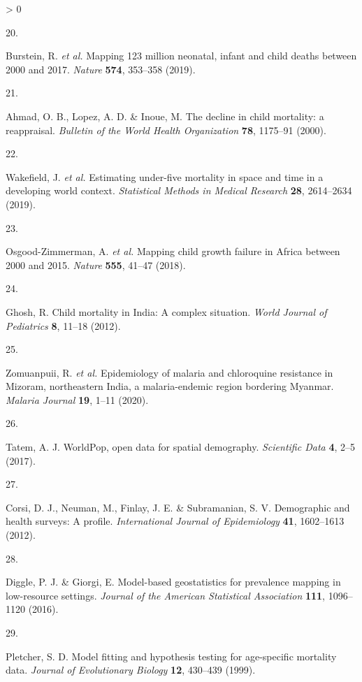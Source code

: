 \documentclass[
]{article}
\newlength{\cslhangindent}
\newlength{\csllabelwidth}
\newenvironment{CSLReferences}[2] %
 {%
  \setlength{\parindent}{0pt}
  \ifodd #1 \everypar{\setlength{\hangindent}{\cslhangindent}}\ignorespaces\fi
  \ifnum #2 > 0
  \setlength{\parskip}{#2\baselineskip}
  \fi
 }%
 {}
\newcommand{\CSLLeftMargin}[1]{\parbox[t]{\csllabelwidth}{#1}}
\newcommand{\CSLRightInline}[1]{\parbox[t]{\linewidth - \csllabelwidth}{#1}\break}
\begin{document}
\begin{CSLReferences}{0}{0}
\leavevmode\hypertarget{ref-Burstein2019}{}%
\CSLLeftMargin{20. }
\CSLRightInline{Burstein, R. \emph{et al.} {Mapping 123 million neonatal, infant and child deaths between 2000 and 2017}. \emph{Nature} \textbf{574}, 353--358 (2019).}

\leavevmode\hypertarget{ref-Ahmad2000}{}%
\CSLLeftMargin{21. }
\CSLRightInline{Ahmad, O. B., Lopez, A. D. \& Inoue, M. {The decline in child mortality: a reappraisal.} \emph{Bulletin of the World Health Organization} \textbf{78}, 1175--91 (2000).}

\leavevmode\hypertarget{ref-Wakefield2019}{}%
\CSLLeftMargin{22. }
\CSLRightInline{Wakefield, J. \emph{et al.} {Estimating under-five mortality in space and time in a developing world context}. \emph{Statistical Methods in Medical Research} \textbf{28}, 2614--2634 (2019).}

\leavevmode\hypertarget{ref-Osgood-Zimmerman2018}{}%
\CSLLeftMargin{23. }
\CSLRightInline{Osgood-Zimmerman, A. \emph{et al.} {Mapping child growth failure in Africa between 2000 and 2015}. \emph{Nature} \textbf{555}, 41--47 (2018).}

\leavevmode\hypertarget{ref-Ghosh2012}{}%
\CSLLeftMargin{24. }
\CSLRightInline{Ghosh, R. {Child mortality in India: A complex situation}. \emph{World Journal of Pediatrics} \textbf{8}, 11--18 (2012).}

\leavevmode\hypertarget{ref-Zomuanpuii2020}{}%
\CSLLeftMargin{25. }
\CSLRightInline{Zomuanpuii, R. \emph{et al.} {Epidemiology of malaria and chloroquine resistance in Mizoram, northeastern India, a malaria-endemic region bordering Myanmar}. \emph{Malaria Journal} \textbf{19}, 1--11 (2020).}

\leavevmode\hypertarget{ref-Tatem2017}{}%
\CSLLeftMargin{26. }
\CSLRightInline{Tatem, A. J. {WorldPop, open data for spatial demography}. \emph{Scientific Data} \textbf{4}, 2--5 (2017).}

\leavevmode\hypertarget{ref-Corsi2012}{}%
\CSLLeftMargin{27. }
\CSLRightInline{Corsi, D. J., Neuman, M., Finlay, J. E. \& Subramanian, S. V. {Demographic and health surveys: A profile}. \emph{International Journal of Epidemiology} \textbf{41}, 1602--1613 (2012).}

\leavevmode\hypertarget{ref-Diggle2016}{}%
\CSLLeftMargin{28. }
\CSLRightInline{Diggle, P. J. \& Giorgi, E. {Model-based geostatistics for prevalence mapping in low-resource settings}. \emph{Journal of the American Statistical Association} \textbf{111}, 1096--1120 (2016).}

\leavevmode\hypertarget{ref-Pletcher1999}{}%
\CSLLeftMargin{29. }
\CSLRightInline{Pletcher, S. D. {Model fitting and hypothesis testing for age-specific mortality data}. \emph{Journal of Evolutionary Biology} \textbf{12}, 430--439 (1999).}


\end{CSLReferences}
\end{document}
